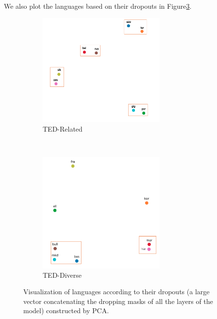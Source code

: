 \documentclass[11pt]{article}
\begin{document}
We also plot the languages based on their dropouts in Figure\ref{fig:visual}.
\begin{figure}[htbp]
\begin{subfigure}{\textwidth}
  \centering
  \includegraphics[width=0.7\textwidth]{ted_related}  
  \caption{TED-Related}
  \label{fig:visual-related}
\end{subfigure}
\\
\begin{subfigure}{\textwidth}
  \centering
  \includegraphics[width=0.7\textwidth]{ted_diverse}  
  \caption{TED-Diverse}
  \label{fig:visual-diverse}
\end{subfigure}
\caption{Visualization of languages according to their dropouts (a large vector concatenating the dropping masks of all the layers of the model) constructed by PCA.}
\label{fig:visual}
\end{figure}
\end{document}
